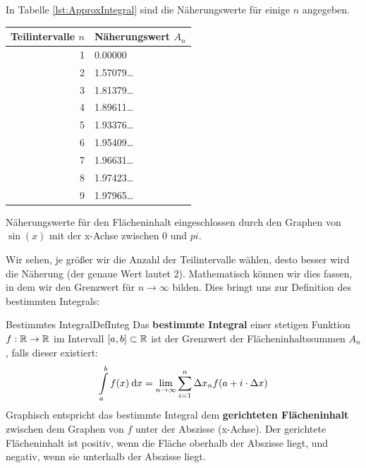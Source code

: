 In Tabelle \ref{lst:ApproxIntegral} sind die Näherungswerte für einige $n$ angegeben.

\begin{listing}
    \begin{center}
        \begin{tabular}{ r | l}
            \textbf{Teilintervalle $n$} & \textbf{Näherungswert $A_n$} \\
            \hline
            1 & 0.00000 \\
            2 & 1.57079\dots \\
            3 & 1.81379\dots \\
            4 & 1.89611\dots \\
            5 & 1.93376\dots \\
            6 & 1.95409\dots \\
            7 & 1.96631\dots \\
            8 & 1.97423\dots \\
            9 & 1.97965\dots
        \end{tabular}
    \end{center}
    \caption[Näherungsweise Berechnung eines bestimmen Integrals]{Näherungswerte für den Flächeninhalt eingeschlossen durch den Graphen von $\sin(x)$ mit der x-Achse zwischen $0$ und $pi$.}
    \label{lst:ApproxIntegral}
\end{listing}

Wir sehen, je größer wir die Anzahl der Teilintervalle wählen, desto besser wird die Näherung (der genaue Wert lautet $2$). Mathematisch können wir dies fassen, in dem wir den Grenzwert für $n \to \infty$ bilden. Dies bringt uns zur Definition des bestimmten Integrals:

\begin{definition}{Bestimmtes Integral}{DefInteg}
    Das \textbf{bestimmte Integral} einer stetigen Funktion $f: \mathbb{R} \to \mathbb{R}$ im Intervall $[a,b] \subset \mathbb{R}$ ist der Grenzwert der Flächeninhaltssummen $A_n$, falls dieser existiert:
    $$
        \int\limits_{a}^b f(x) \:\mathrm{d}{x} = \lim\limits_{n\to\infty} \sum_{i=1}^{n} \Delta x_n f(a + i\cdot\Delta x)
    $$
    Graphisch entspricht das bestimmte Integral dem \textbf{gerichteten Flächeninhalt} zwischen dem Graphen von $f$ unter der Abszisse (x-Achse). Der gerichtete Flächeninhalt ist positiv, wenn die Fläche oberhalb der Abszisse liegt, und negativ, wenn sie unterhalb der Abszisse liegt.
\end{definition}

